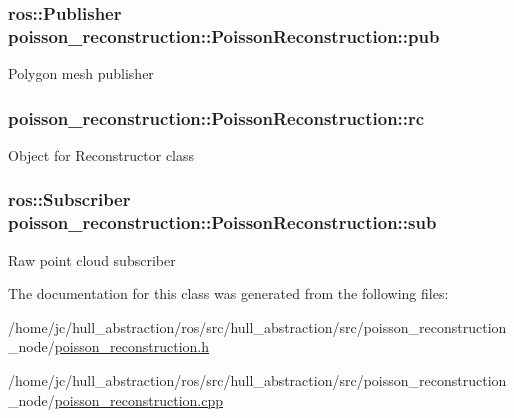 \subsubsection[{\texorpdfstring{pub}{pub}}]{\setlength{\rightskip}{0pt plus 5cm}ros\+::\+Publisher poisson\+\_\+reconstruction\+::\+Poisson\+Reconstruction\+::pub\hspace{0.3cm}{\ttfamily [private]}}\hypertarget{classpoisson__reconstruction_1_1_poisson_reconstruction_ad327638b4ca620ad0eebc8c9ba2f0dc5}{}\label{classpoisson__reconstruction_1_1_poisson_reconstruction_ad327638b4ca620ad0eebc8c9ba2f0dc5}
Polygon mesh publisher 
\subsubsection[{\texorpdfstring{rc}{rc}}]{ poisson\+\_\+reconstruction\+::\+Poisson\+Reconstruction\+::rc\hspace{0.3cm}{\ttfamily [private]}}\hypertarget{classpoisson__reconstruction_1_1_poisson_reconstruction_a2afb3b38fc52d7d8a0ef3e9a4d65027b}{}\label{classpoisson__reconstruction_1_1_poisson_reconstruction_a2afb3b38fc52d7d8a0ef3e9a4d65027b}
Object for Reconstructor class 
\subsubsection[{\texorpdfstring{sub}{sub}}]{\setlength{\rightskip}{0pt plus 5cm}ros\+::\+Subscriber poisson\+\_\+reconstruction\+::\+Poisson\+Reconstruction\+::sub\hspace{0.3cm}{\ttfamily [private]}}\hypertarget{classpoisson__reconstruction_1_1_poisson_reconstruction_a35abf57328b8f673fa0d0631378d8f19}{}\label{classpoisson__reconstruction_1_1_poisson_reconstruction_a35abf57328b8f673fa0d0631378d8f19}
Raw point cloud subscriber 

The documentation for this class was generated from the following files\+:\begin{DoxyCompactItemize}
\item 
/home/jc/hull\+\_\+abstraction/ros/src/hull\+\_\+abstraction/src/poisson\+\_\+reconstruction\+\_\+node/\hyperlink{poisson__reconstruction_8h}{poisson\+\_\+reconstruction.\+h}\item 
/home/jc/hull\+\_\+abstraction/ros/src/hull\+\_\+abstraction/src/poisson\+\_\+reconstruction\+\_\+node/\hyperlink{poisson__reconstruction_8cpp}{poisson\+\_\+reconstruction.\+cpp}\end{DoxyCompactItemize}
